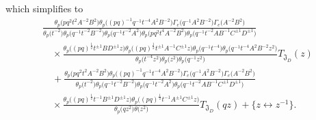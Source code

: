 \documentclass[a4paper,12pt]{article}
\begin{document}
which simplifies to
\begin{gather*}
\frac{\theta_p\big(pq^2t^2A^{-2}B^2\big)\theta_p\big((pq)^{-1}q^{-1}t^{-4}A^2B^{-2}\big)\Gamma_e\big(q^{-1}A^2B^{-2}\big)\Gamma_e\big(A^{-2}B^2\big)}
{\theta_p\big(t^{-2}\big)\theta_p\big(q^{-1}t^{-2}B^{-2}\big)\theta_p\big(q^{-1}t^{-2}A^2\big)\theta_p\big(pq^2t^4A^{-2}B^2\big)
\theta_p\big(q^{-1}t^{-2}AB^{-1}C^{\pm1}D^{\pm1}\big)}\\
\quad{}\times\frac{\theta_p\big((pq)^\frac{1}{2}t^{\pm1}BD^{\pm1}z\big)
\theta_p\big((pq)^\frac{1}{2}t^{\pm1}A^{-1}C^{\pm1}z\big)
\theta_p\big(q^{-1}t^{-4}\big)\theta_p\big(q^{-1}t^{-4}A^2B^{-2}z^2\big)}
{\theta_p\big(t^{-4}z^2\big)\theta_p\big(z^2\big)\theta_p\big(q^{-1}z^2\big)}T_{{\mathfrak J}_D}(z)\\
\quad{}+ \frac{\theta_p\big(pq^2t^2A^{-2}B^2\big)\theta_p\big((pq)^{-1}q^{-1}t^{-4}A^2B^{-2}\big)\Gamma_e\big(q^{-1}A^2B^{-2}\big)\Gamma_e\big(A^{-2}B^2\big)}
{\theta_p\big(t^{-2}\big)\theta_p\big(q^{-1}t^{-2}B^{-2}\big)\theta_p\big(q^{-1}t^{-2}A^2\big)
\theta_p\big(q^{-1}t^{-2}AB^{-1}C^{\pm1}D^{\pm1}\big)}\\
\quad{}\times\frac{\theta_p\big((pq)^\frac{1}{2}t^{-1}B^{\pm1}D^{\pm1}z\big)
\theta_p\big((pq)^\frac{1}{2}t^{-1}A^{\pm1}C^{\pm1}z\big)}
{\theta_p\big(qz^2\big)\theta\big(z^2\big)}T_{{\mathfrak J}_D}(qz) + \big\{z\leftrightarrow z^{-1}\big\} .
\end{gather*}
\end{document}
